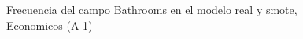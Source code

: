 \begin{figure}[H]
    \centering
    
    \caption{Frecuencia del campo Bathrooms en el modelo real y smote, Economicos (A-1)}
    \label{frecuency-Bathrooms-smote-enc}
\end{figure}